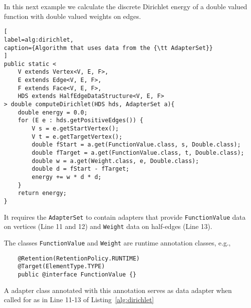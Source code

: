 In this next example we calculate the discrete Dirichlet energy of a double valued function with 
double valued weights on edges. 

\begin{lstlisting}[
label=alg:dirichlet,
caption={Algorithm that uses data from the {\tt AdapterSet}}
]
public static <
	V extends Vertex<V, E, F>,
	E extends Edge<V, E, F>,
	F extends Face<V, E, F>,
	HDS extends HalfEdgeDataStructure<V, E, F>
> double computeDirichlet(HDS hds, AdapterSet a){
	double energy = 0.0;
	for (E e : hds.getPositiveEdges()) {
		V s = e.getStartVertex();
		V t = e.getTargetVertex();
		double fStart = a.get(FunctionValue.class, s, Double.class);
		double fTarget = a.get(FunctionValue.class, t, Double.class);
		double w = a.get(Weight.class, e, Double.class);
		double d = fStart - fTarget;
		energy += w * d * d; 
	}
	return energy;
}
\end{lstlisting}

It requires the {\tt AdapterSet} to contain adapters that provide
{\tt FunctionValue} data on vertices (Line 11 and 12) and {\tt Weight} data on half-edges (Line 13). 

The classes {\tt FunctionValue} and {\tt Weight} are runtime annotation classes, e.g.,

\begin{lstlisting}
	@Retention(RetentionPolicy.RUNTIME)
	@Target(ElementType.TYPE)
	public @interface FunctionValue {}
\end{lstlisting}

A adapter class annotated with this annotation serves as data adapter when called for as in Line 11-13
of Listing~\ref{alg:dirichlet}























